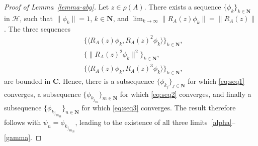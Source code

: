 \documentclass[10pt,a4paper]{amsart}
\newcommand{\bC}{\mathbf{C}}
\newcommand{\bN}{\mathbf{N}}
\newcommand{\cH}{\mathcal{H}}
\newcommand{\ip}[2]{\langle{#1},{#2}\rangle} %
\newcommand{\norm}[1]{\lVert{#1}\rVert} %
\begin{document}
\begin{proof}[Proof of Lemma~\ref{lemma-abg}]
	Let $z\in\rho(A)$. There exists a sequence $\{\phi_k\}_{k\in\bN}$ in $\cH$, such that $\norm{\phi_k}=1$, $k\in\bN$, and $\lim_{k\to\infty}\norm{R_A(z)\phi_k}=\norm{R_A(z)}$. 
	The three sequences 
	\begin{align}
		&\{\ip{R_A(z)\phi_k}{R_A(z)^2\phi_k}\}_{k\in\bN}, \label{eq:seq1} \\
		&\{\norm{R_A(z)^2\phi_k}^2\}_{k\in\bN}, \label{eq:seq2} \\
		&\{\ip{R_A(z)\phi_k}{R_A(z)^3\phi_k}\}_{k\in\bN}, \label{eq:seq3}
	\end{align}
	are bounded in $\bC$. Hence, there is a subsequence $\{\phi_{k_j}\}_{j\in\bN}$ for which \eqref{eq:seq1} converges, a subsequence $\{\phi_{{k_j}_m}\}_{m\in\bN}$ for which \eqref{eq:seq2} converges, and finally a subsequence $\{\phi_{{{k_j}_m}_n}\}_{n\in\bN}$ for which \eqref{eq:seq3} converges. The result therefore follows with $\psi_n = \phi_{{{k_j}_m}_n}$, leading to the existence of all three limits~\eqref{alpha}--\eqref{gamma}. 
\end{proof}
\end{document}
